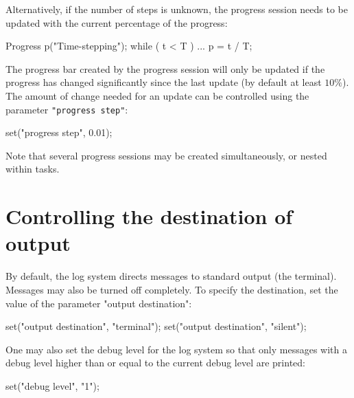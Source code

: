 Alternatively, if the number of steps is unknown, the progress session
needs to be updated with the current percentage of the progress:
\begin{code}
Progress p("Time-stepping");
while ( t < T )
{
  ...
  p = t / T;
}
\end{code}

The progress bar created by the progress session will only be updated
if the progress has changed significantly since the last update (by
default at least $10\%$). The
amount of change needed for an update can be controlled using the
parameter \texttt{"progress step"}:
\begin{code}
set("progress step", 0.01);
\end{code}

Note that several progress sessions may be created simultaneously, or
nested within tasks.

\section{Controlling the destination of output}

By default, the \dolfin{} log system directs messages to standard
output (the terminal). Messages may also be turned off completely.
To specify the destination, set the value of the parameter "output destination":
\begin{code}
set("output destination", "terminal");
set("output destination", "silent");
\end{code}

One may also set the debug level for the \dolfin{} log system so that
only messages with a debug level higher than or equal to the current
debug level are printed:
\begin{code}
set("debug level", "1");
\end{code}
